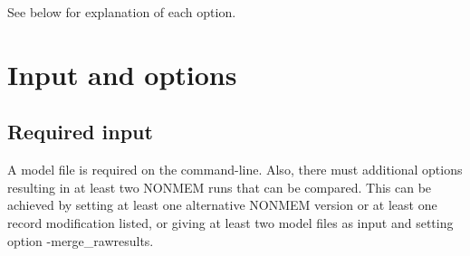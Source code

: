 See below for explanation of each option.

	\section{Input and options}

		\subsection{Required input}
		A model file is required on the command-line. 
		Also, there must additional options resulting in at least two NONMEM runs that can be compared. This can be
		achieved by setting at least one alternative NONMEM version or at least one record modification listed,
		or giving at least two model files as input and setting option -merge\_rawresults. 
	

